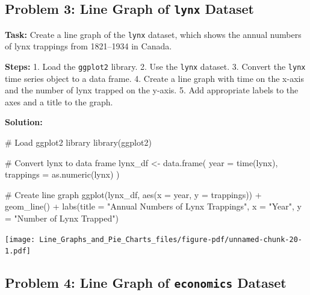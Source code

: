 \documentclass[
  letterpaper,
  DIV=11,
  numbers=noendperiod]{scrreprt}
\newenvironment{Shaded}{\begin{snugshade}}{\end{snugshade}}
\newcommand{\AttributeTok}[1]{\textcolor[rgb]{0.40,0.45,0.13}{#1}}
\newcommand{\CommentTok}[1]{\textcolor[rgb]{0.37,0.37,0.37}{#1}}
\newcommand{\FunctionTok}[1]{\textcolor[rgb]{0.28,0.35,0.67}{#1}}
\newcommand{\NormalTok}[1]{\textcolor[rgb]{0.00,0.23,0.31}{#1}}
\newcommand{\OtherTok}[1]{\textcolor[rgb]{0.00,0.23,0.31}{#1}}
\newcommand{\SpecialCharTok}[1]{\textcolor[rgb]{0.37,0.37,0.37}{#1}}
\newcommand{\StringTok}[1]{\textcolor[rgb]{0.13,0.47,0.30}{#1}}
\begin{document}
\subsection*{\texorpdfstring{Problem 3: Line Graph of \texttt{lynx}
Dataset}{Problem 3: Line Graph of lynx Dataset}}\label{problem-3-line-graph-of-lynx-dataset}

\textbf{Task:} Create a line graph of the \texttt{lynx} dataset, which
shows the annual numbers of lynx trappings from 1821--1934 in Canada.

\textbf{Steps:} 1. Load the \texttt{ggplot2} library. 2. Use the
\texttt{lynx} dataset. 3. Convert the \texttt{lynx} time series object
to a data frame. 4. Create a line graph with time on the x-axis and the
number of lynx trapped on the y-axis. 5. Add appropriate labels to the
axes and a title to the graph.

\textbf{Solution:}

\begin{Shaded}
\begin{Highlighting}[]
\CommentTok{\# Load ggplot2 library}
\FunctionTok{library}\NormalTok{(ggplot2)}

\CommentTok{\# Convert lynx to data frame}
\NormalTok{lynx\_df }\OtherTok{\textless{}{-}} \FunctionTok{data.frame}\NormalTok{(}
  \AttributeTok{year =} \FunctionTok{time}\NormalTok{(lynx),}
  \AttributeTok{trappings =} \FunctionTok{as.numeric}\NormalTok{(lynx)}
\NormalTok{)}

\CommentTok{\# Create line graph}
\FunctionTok{ggplot}\NormalTok{(lynx\_df, }\FunctionTok{aes}\NormalTok{(}\AttributeTok{x =}\NormalTok{ year, }\AttributeTok{y =}\NormalTok{ trappings)) }\SpecialCharTok{+}
  \FunctionTok{geom\_line}\NormalTok{() }\SpecialCharTok{+}
  \FunctionTok{labs}\NormalTok{(}\AttributeTok{title =} \StringTok{"Annual Numbers of Lynx Trappings"}\NormalTok{,}
       \AttributeTok{x =} \StringTok{"Year"}\NormalTok{,}
       \AttributeTok{y =} \StringTok{"Number of Lynx Trapped"}\NormalTok{)}
\end{Highlighting}
\end{Shaded}

\texttt{[image: Line\_Graphs\_and\_Pie\_Charts\_files/figure-pdf/unnamed-chunk-20-1.pdf]}

\subsection*{\texorpdfstring{Problem 4: Line Graph of \texttt{economics}
Dataset}{Problem 4: Line Graph of economics Dataset}}\label{problem-4-line-graph-of-economics-dataset}
\end{document}
